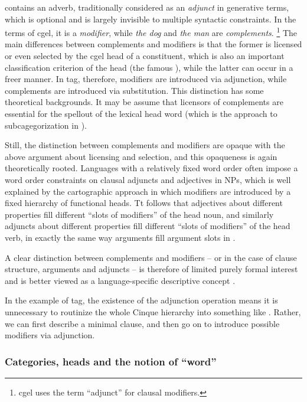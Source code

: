 \documentclass[../main.tex]{subfiles}
\begin{document}
 contains an adverb, 
traditionally considered as an \emph{adjunct} in generative terms, 
which is optional and is largely invisible to multiple syntactic constraints. 
In the terms of \ac{cgel}, it is a \emph{modifier}, 
while \emph{the dog} and \emph{the man} are \emph{complements}.%
\footnote{\ac{cgel} uses the term ``adjunct'' for clausal modifiers.}
The main differences between complements and modifiers 
is that the former is licensed or even selected by the \ac{cgel} head of a constituent, 
which is also an important classification criterion of the head (the famous ),
while the latter can occur in a freer manner. 
In \ac{tag}, therefore, modifiers are introduced via adjunction, 
while complements are introduced via substitution.
This distinction has some theoretical backgrounds.
It may be assume that licensors of complements are essential for the spellout of the lexical head word
(which is the approach to subcagegorization in \citet{siddiqi2009syntax}).

Still, the distinction between complements and modifiers are opaque with 
the above argument about licensing and selection, and this opaqueness is again theoretically rooted. 
Languages with a relatively fixed word order often impose 
a word order constraints on clausal adjuncts and adjectives in NPs, 
which is well explained by the cartographic approach in which modifiers 
are introduced by a fixed hierarchy of functional heads. 
Tt follows that adjectives about different properties fill different ``slots of modifiers'' of the head noun, 
and similarly adjuncts about different properties fill different ``slots of modifiers'' of the head verb, 
in exactly the same way arguments fill argument slots in . 

A clear distinction between complements and modifiers -- 
or in the case of clause structure, arguments and adjuncts -- 
is therefore of limited purely formal interest and 
is better viewed as a language-specific descriptive concept \citep{haspelmath2014arguments}. 

In the example of \ac{tag}, the existence of the adjunction operation means it is unnecessary
to routinize the whole Cinque hierarchy into something like .
Rather, we can first describe a minimal clause, 
and then go on to introduce possible modifiers via adjunction. 

\subsubsection{Categories, heads and the notion of ``word''}
\end{document}
